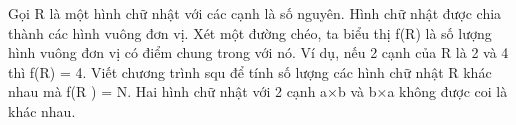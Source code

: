 Gọi R là một hình chữ nhật với các cạnh là số nguyên. Hình chữ nhật được chia thành các hình vuông đơn vị. Xét một đường chéo, ta biểu thị f(R) là số lượng hình vuông đơn vị có điểm chung trong với nó. Ví dụ, nếu 2 cạnh của R là 2 và 4 thì f(R) = 4. Viết chương trình squ để tính số lượng các hình chữ nhật R khác nhau mà f(R ) = N. Hai hình chữ nhật với 2 cạnh a×b và b×a không được coi là khác nhau.  

\